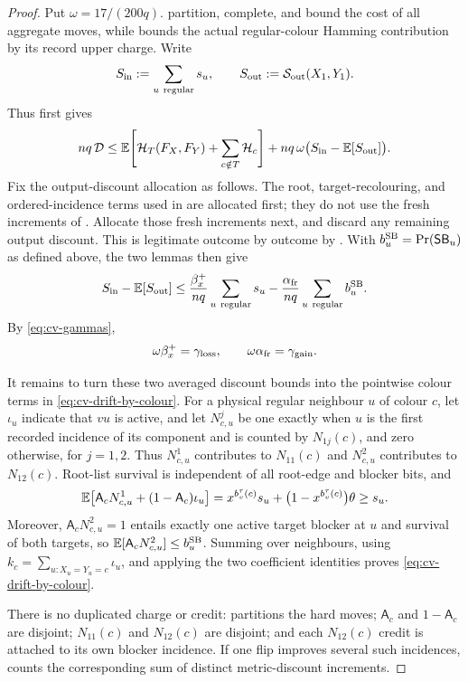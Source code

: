 \begin{proof}
Put $\omega=17/(200q)$.
partition, complete, and bound the cost of all
aggregate moves, while  bounds the actual
regular-colour Hamming contribution by its record upper charge.
Write
\[
  S_{\rm in}:=\sum_{u\ {\rm regular}}s_u,
  \qquad
  S_{\rm out}:=\mathcal S_{\rm out}(X_1,Y_1).
\]
Thus
 first gives
\begin{equation}\label{eq:cv-drift-decomp}
 nq\,\mathcal D
 \le \operatorname{\mathbb{E}}\!\left[\mathcal H_T(F_X,F_Y)+
                  \sum_{c\notin T}\mathcal H_c\right]
   +nq\,\omega\bigl(S_{\rm in}-\operatorname{\mathbb{E}}[S_{\rm out}]\bigr).
\end{equation}
Fix the output-discount allocation as
follows. The root, target-recolouring, and
ordered-incidence terms used in  are allocated
first; they do not use the fresh increments of
.  Allocate those fresh increments next, and discard any
remaining output discount.  This is legitimate outcome by outcome by
. With
\(b_u^{\rm SB}=\Pr(\mathsf{SB}_u)\) as defined above, the two lemmas then give
\[
 S_{\rm in}-\operatorname{\mathbb{E}}[S_{\rm out}]
 \le \frac{\beta_x^+}{nq}\sum_{u\ {\rm regular}}s_u
    -\frac{\alpha_{\mathrm{fr}}}{nq}\sum_{u\ {\rm regular}}b_u^{\rm SB} .
\]
By \eqref{eq:cv-gammas},
\[
 \omega\beta_x^+=\gamma_{\rm loss},\qquad
 \omega\alpha_{\mathrm{fr}}=\gamma_{\rm gain}.
\]

It remains to turn these two averaged discount bounds into the
pointwise colour terms in \eqref{eq:cv-drift-by-colour}. For a physical regular neighbour
$u$ of colour $c$, let $\iota_u$ indicate that $vu$ is active, and let
\(N^j_{c,u}\) be one exactly when \(u\) is the first recorded incidence
of its component and is counted by \(N_{1j}(c)\), and zero otherwise,
for \(j=1,2\).  Thus \(N^1_{c,u}\) contributes to \(N_{11}(c)\) and
\(N^2_{c,u}\) contributes to \(N_{12}(c)\). Root-list
survival is independent of all root-edge and blocker bits, and
\[
 \operatorname{\mathbb{E}}\!\left[\mathsf A_c N^1_{c,u}
            +(1-\mathsf A_c)\iota_u\right]
 =x^{b_v^\tau(c)}s_u+
   \bigl(1-x^{b_v^\tau(c)}\bigr)\theta
 \ge s_u .
\]
Moreover, $\mathsf A_c N^2_{c,u}=1$ entails exactly one active target
blocker at $u$ and survival of both targets, so
  $\operatorname{\mathbb{E}}[\mathsf A_c N^2_{c,u}]\le b_u^{\rm SB}$. Summing over neighbours, using
\(k_c=\sum_{u:X_u=Y_u=c}\iota_u\), and applying the two coefficient identities proves
\eqref{eq:cv-drift-by-colour}.

There is no duplicated charge or credit:
 partitions the hard moves;
$\mathsf A_c$ and $1-\mathsf A_c$ are disjoint;
$N_{11}(c)$ and $N_{12}(c)$ are disjoint; and each $N_{12}(c)$ credit is
attached to its own blocker incidence. If one flip improves
several such incidences,  counts the corresponding sum
of distinct metric-discount increments.
\end{proof}

